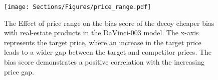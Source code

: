 \begin{figure}[t!]
\centering
\texttt{[image: Sections/Figures/price\_range.pdf]}
\caption{The Effect of price range on the bias score of the decoy cheaper bias with real-estate products in the DaVinci-003 model. The x-axis represents the target price, where an increase in the target price leads to a wider gap between the target and competitor prices. The bias score demonstrates a positive correlation with the increasing price gap.}
\label{fig:decoy_prices}
\end{figure}
